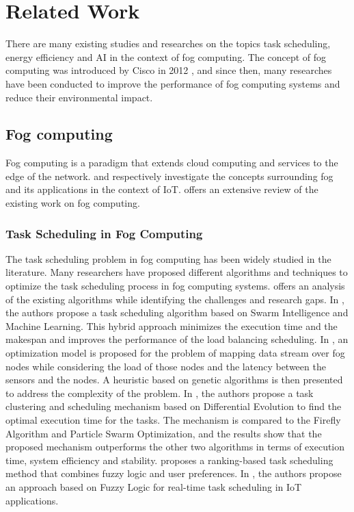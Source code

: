 \chapter*{Related Work}
\label{chap:relatedwork}

There are many existing studies and researches on the topics task scheduling, energy efficiency and AI in the context
of fog computing. The concept of fog computing was introduced by Cisco in 2012 \cite{bonomi-et-al-2012}, and since
then, many researches have been conducted to improve the performance of fog computing systems and reduce their
environmental impact.

\section*{Fog computing}

Fog computing is a paradigm that extends cloud computing and services to the edge of the network.
\cite{rana-abubacker-2023} and \cite{abubacker-et-al-2023} respectively investigate the concepts surrounding fog
and its applications in the context of IoT. \cite{al-musawi-et-al-2023} offers an extensive review of the existing
work on fog computing.

\subsection*{Task Scheduling in Fog Computing}

The task scheduling problem in fog computing has been widely studied in the literature. Many researchers have proposed
different algorithms and techniques to optimize the task scheduling process in fog computing systems.
\cite{misirli-casalicchio-2024} offers an analysis of the existing algorithms while identifying the challenges and
research gaps. In \cite{rjoub-bentahar-2017}, the authors propose a task scheduling algorithm based on Swarm
Intelligence and Machine Learning. This hybrid approach minimizes the execution time and the makespan and improves the
performance of the load balancing scheduling. In \cite{canali-lancellotti-2019}, an optimization model is proposed for
the problem of mapping data stream over fog nodes while considering the load of those nodes and the latency between the
sensors and the nodes. A heuristic based on genetic algorithms is then presented to address the complexity of the
problem. In \cite{yousif-et-al-2024}, the authors propose a task clustering and scheduling mechanism based on
Differential Evolution to find the optimal execution time for the tasks. The mechanism is compared to the Firefly
Algorithm and Particle Swarm Optimization, and the results show that the proposed mechanism outperforms the other two
algorithms in terms of execution time, system efficiency and stability. \cite{benblidia-et-al-2019} proposes a
ranking-based task scheduling method that combines fuzzy logic and user preferences. In \cite{ali-et-al-2021}, the
authors propose an approach based on Fuzzy Logic for real-time task scheduling in IoT applications.

